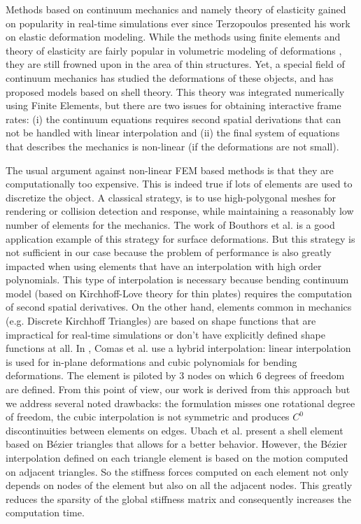 \documentclass{egpubl}
\newcommand{\CD}[1]{{\color{magenta}{\textbf{C: #1}}}}
\begin{document}
Methods based on continuum mechanics and namely theory of elasticity gained on popularity in real-time simulations ever since Terzopoulos \cite{Terzopoulos1987} presented his work on elastic deformation modeling.
While the methods using finite elements and theory of elasticity are fairly popular in volumetric modeling of deformations \cite{Cotin1999,Nesme2006,Miller2007}, they are still frowned upon in the area of thin structures. 
Yet, a special field of continuum mechanics has studied the deformations of these objects, and has proposed models based on shell theory.
This theory was integrated numerically \CD{Todo citation of a shell book} using Finite Elements, but there are two issues for obtaining interactive frame rates: 
(i) the continuum equations requires second spatial derivations that can not be handled with linear interpolation and 
(ii) the final system of equations that describes the mechanics is non-linear (if the deformations are not small).

The usual argument against non-linear FEM based methods is that they are computationally too expensive. 
This is indeed true if lots of elements are used to discretize the object.
A classical strategy, is to use high-polygonal meshes for rendering or collision detection and response, while maintaining a reasonably low number of elements for the mechanics.
The work of Bouthors et al.\cite{Bouthors2007} is a good application example of this strategy for surface deformations.
But this strategy is not sufficient in our case because the problem of performance is also greatly impacted when using elements that have an interpolation with high order polynomials.
This type of interpolation is necessary because bending continuum model
(based on Kirchhoff-Love theory for thin plates)  requires the computation of second spatial derivatives.
On the other hand, elements common in mechanics (e.g. Discrete Kirchhoff Triangles) are based on shape functions that are impractical for real-time simulations or don't have explicitly defined shape functions at all.
In \cite{Comas2010c}, Comas et al. use a hybrid interpolation: linear interpolation is used for in-plane deformations and cubic polynomials for bending deformations.
The element is piloted by 3 nodes on which 6 degrees of freedom are defined. 
From this point of view, our work is derived from this approach but we address several noted drawbacks: the formulation misses one rotational degree of freedom, the cubic interpolation is not symmetric and produces $C^0$  discontinuities between elements on edges.
Ubach et al. \cite{Ubach2010}  present a shell element based on B\'ezier triangles that allows for a better behavior.
However, the B\'ezier interpolation defined on each triangle element is based on the motion computed on adjacent triangles.
So the stiffness forces computed on each element not only depends on nodes of the element but also on all the adjacent nodes. 
This greatly reduces the sparsity of the global stiffness matrix and consequently increases the computation time.
\end{document}
